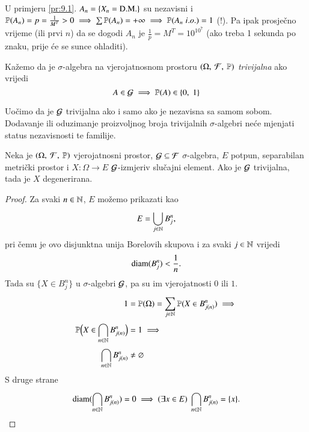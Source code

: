 \begin{nap} \label{nap:9.4}
    U primjeru \ref{pr:9.1}. $A_n = \{ X_n = \textnormal{D.M.} \}$ su nezavisni i $\mathbb{P}({A_n}) = p = \frac{1}{M^T} > 0 \implies \sum \mathbb{P}({A_n}) = +\infty \implies \mathbb{P}({A_n \; i.o.}) = 1$ (!).
    Pa ipak prosje\v cno vrijeme (ili prvi $n$) da se dogodi $A_n$ je $\frac{1}{p} = M^T = 10^{10^7}$ (ako treba 1 sekunda po znaku, prije \' ce se sunce ohladiti).
\end{nap}

\begin{defn}    \label{defn:9.5}
    Ka\v zemo da je $\sigma$-algebra na vjerojatnosnom prostoru $(\Omega, \: \mathcal{F}, \: \mathbb{P})$ \emph{trivijalna} ako vrijedi
    \begin{equation*}
        A \in \mathcal{G} \implies \mathbb{P}({A}) \in \{0, \; 1\}
    \end{equation*}
\end{defn}

Uo\v cimo da je $\mathcal{G}$ trivijalna ako i samo ako je nezavisna sa samom sobom.
Dodavanje ili oduzimanje proizvoljnog broja trivijalnih $\sigma$-algebri ne\' ce mjenjati status nezavisnosti te familije.

\begin{lm}  \label{lm:9.6}
    Neka je $(\Omega, \: \mathcal{F}, \: \mathbb{P})$ vjerojatnosni prostor, $\mathcal{G} \subseteq \mathcal{F}$ $\sigma$-algebra, $E$ potpun, separabilan metri\v cki prostor i $X : \Omega \to E$ $\mathcal{G}$-izmjeriv slu\v cajni element.
    Ako je $\mathcal{G}$ trivijalna, tada je $X$ degenerirana.
\end{lm}

\begin{proof}
    Za svaki $n \in \mathbb{N}$, $E$ mo\v zemo prikazati kao
    \begin{equation*}
        E = \bigcup\limits_{j \in \mathbb{N}}^{} B_j^n,
    \end{equation*}
    pri \v cemu je ovo disjunktna unija Borelovih skupova i za svaki $j \in \mathbb{N}$ vrijedi
    \begin{equation*}
        \mathrm{diam}(B_j^n) < \frac{1}{n}.
    \end{equation*}
    Tada su $\{ X \in B_j^n \}$ u $\sigma$-algebri $\mathcal{G}$, pa su im vjerojatnosti $0$ ili $1$.
    \begin{equation*}
        \begin{aligned}
            1 &= \mathbb{P}({\Omega}) = \sum\limits_{j \in \mathbb{N}}^{} \mathbb{P}({X \in B_{j(n)}^n}) \implies\\
            \mathbb{P} \Big( X \in \bigcap\limits_{n \in \mathbb{N}}^{} B_{j(n)}^n \Big) &= 1 \implies\\
            \bigcap\limits_{n \in \mathbb{N}}^{} B_{j(n)}^n &\neq \varnothing
        \end{aligned}
    \end{equation*}
    S druge strane
    \begin{equation*}
        \mathrm{diam}(\bigcap\limits_{n \in \mathbb{N}}^{}B_{j(n)}^n) = 0 \implies (\exists x \in E) \; \bigcap\limits_{n \in \mathbb{N}}^{} B_{j(n)}^n = \{ x \}.
    \end{equation*}
\end{proof}

